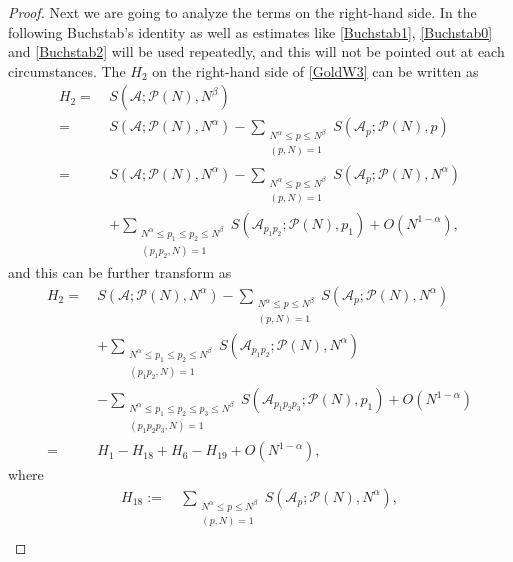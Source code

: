 \documentclass[12pt, a4paper]{amsart}
\def\le{\leqslant}
\theoremstyle{plain}
\theoremstyle{remark}
\numberwithin{equation}{section}
\begin{document}
\begin{proof}
Next we are going to analyze the terms on the right-hand side. In the following Buchstab's identity as well as 
estimates like \eqref{Buchstab1}, \eqref{Buchstab0} and \eqref{Buchstab2} will be used repeatedly, and this will not be 
pointed out at each circumstances. 
The $H_2$ on the right-hand side of \eqref{GoldW3} can be written as
\begin{equation*}
\begin{split}
H_2=\ &S(\mathscr{A};\mathscr{P}(N),N^\beta)\\
=\ & S(\mathscr{A};\mathscr{P}(N),N^\alpha)-\sum\limits_{\substack{N^\alpha\le p\le N^{\beta} \\(p, N)=1}}S(\mathscr{A}_p ; \mathscr{P}(N), p)\\
=\ & S(\mathscr{A};\mathscr{P}(N),N^\alpha)
-\sum\limits_{\substack{N^\alpha\le p\le N^{\beta} \\(p, N)=1}}S(\mathscr{A}_p; \mathscr{P}(N), N^\alpha) \\ 
&+\sum_{\substack{N^\alpha \le p_1 \le p_2 \le N^\beta \\ (p_1 p_2, N) = 1}}  S(\mathscr{A}_{p_1 p_2}; \mathscr{P}(N), p_1)+O(N^{1-\alpha}), 
\end{split}
\end{equation*}
and this can be further transform as 
\begin{equation}\label{GoldW4}
\begin{split}
H_2=\ & S(\mathscr{A};\mathscr{P}(N),N^\alpha)-\sum\limits_{\substack{N^\alpha\le p\le N^{\beta} \\(p, N)=1}}S(\mathscr{A}_p ; \mathscr{P}(N), N^\alpha)\\
		&+\sum_{\substack{N^\alpha \le p_1 \le p_2 \le N^\beta \\ (p_1 p_2, N) = 1}}  S(\mathscr{A}_{p_1 p_2}; \mathscr{P}(N), N^\alpha)\\
		&-\sum_{\substack{N^\alpha \le p_1 \le p_2 \le p_3\le N^\beta \\ (p_1 p_2 p_3, N) = 1}}  S(\mathscr{A}_{p_1 p_2 p_3}; \mathscr{P}(N), p_1)+O(N^{1-\alpha})\\
=\ &H_1-H_{18}+H_6-H_{19}+O(N^{1-\alpha}),
\end{split}
\end{equation}
where 
\begin{equation}
\begin{split}
H_{18}:=\ &\sum\limits_{\substack{N^\alpha\le p\le N^{\beta} \\(p, N)=1}}S(\mathscr{A}_p ; \mathscr{P}(N), N^\alpha),\\

\end{split}
\end{equation}
\end{proof}
\end{document}

